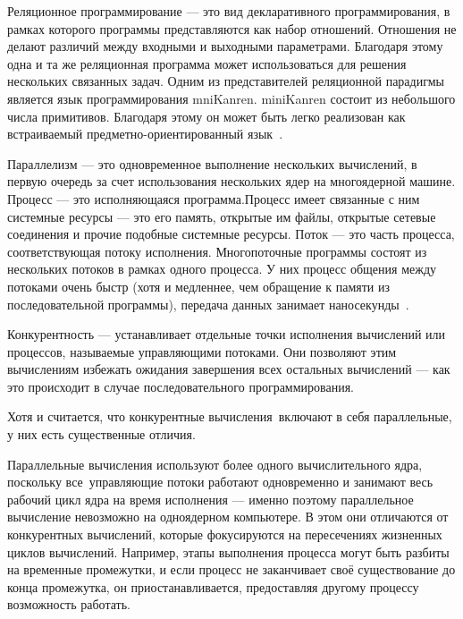 

Реляционное программирование --- это вид декларативного программирования, в рамках которого программы представляются как набор
отношений. Отношения не делают различий между входными и выходными параметрами. Благодаря этому одна и та же реляционная
программа может использоваться для решения нескольких связанных
задач. Одним из представителей реляционной парадигмы является
язык программирования mniKanren. miniKanren состоит из небольшого числа примитивов. Благодаря этому он может быть легко реализован как встраиваемый предметно-ориентированный язык~\cite{moiseenko_podkopaev}. 


Параллелизм --- это одновременное выполнение нескольких вычислений, в первую очередь за счет использования нескольких ядер на многоядерной машине.  
Процесс --- это исполняющаяся программа.Процесс имеет связанные с ним системные ресурсы --- это его память, открытые им файлы, открытые сетевые соединения и прочие подобные системные ресурсы.
Поток --- это часть процесса, соответствующая потоку исполнения.
Многопоточные программы состоят из нескольких потоков в рамках одного процесса. 
У них процесс общения между потоками очень быстр 
(хотя и медленнее, чем обращение к памяти из последовательной программы), 
передача данных занимает наносекунды~\cite{parallel}. 

Конкурентность ---  устанавливает 
отдельные точки исполнения вычислений или процессов, 
называемые управляющими потоками. Они позволяют этим вычислениям избежать ожидания завершения всех 
остальных вычислений --- как это происходит в случае последовательного программирования.

Хотя и считается, что конкурентные вычисления включают в себя параллельные, у них есть существенные отличия.

Параллельные вычисления используют более одного вычислительного ядра, поскольку все управляющие потоки работают одновременно и 
занимают весь рабочий цикл ядра на время исполнения — именно поэтому параллельное вычисление невозможно на одноядерном компьютере. 
В этом они отличаются от конкурентных вычислений, которые фокусируются на пересечениях жизненных циклов вычислений. 
Например, этапы выполнения процесса могут быть разбиты на временные промежутки, и если процесс не заканчивает своё существование 
до конца промежутка, он приостанавливается, предоставляя другому процессу возможность работать.

